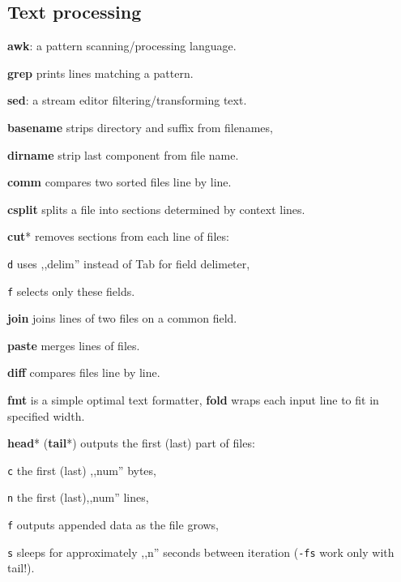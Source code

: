 \subsection*{Text processing}
\begin{enumx}
	\item [\cmd] \textbf{awk}: a pattern scanning/processing language.
	\item [\cmd] \textbf{grep} prints lines matching a pattern.
	\item [\cmd] \textbf{sed}: a stream editor filtering/transforming text.
\end{enumx}


\begin{enumx}
	\item [\cmd] \textbf{basename} strips directory and suffix from filenames, 
	\item [\cmd] \textbf{dirname} strip last component from file name.
\end{enumx}

\textbf{comm} compares two sorted files line by line.

\textbf{csplit} splits a file into sections determined by context lines.

\begin{enumx}
	\item [\cmd] \textbf{cut}* removes sections from each line of files:
	\item [\texttt{d}] uses ,,delim'' instead of Tab for field delimeter,
	\item [\texttt{f}] selects only these fields.
	\item [\cmd] \textbf{join} joins lines of two files on a common field.
	\item [\cmd] \textbf{paste} merges lines of files.
\end{enumx}

\begin{enumx}
	\item [\cmd] \textbf{diff} compares files line by line.
\end{enumx}


\textbf{fmt} is a simple optimal text formatter, 
\textbf{fold} wraps each input line to fit in specified width.

\textbf{head}* (\textbf{tail}*) outputs the first (last) part of files:
\begin{enumx}
	\item [\texttt{c}] the first (last) ,,num'' bytes,
	\item [\texttt{n}] the first (last),,num'' lines,
	\item [\texttt{f}] outputs appended data as the file grows,
	\item [\texttt{s}] sleeps for approximately ,,n'' seconds between iteration 
	                   (\texttt{-fs} work only with tail!).
\end{enumx}

